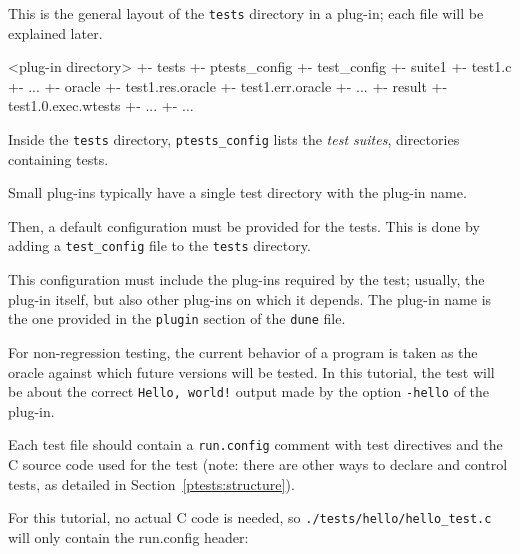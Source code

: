 This is the general layout of the \texttt{tests} directory in a \framac
plug-in; each file will be explained later.

\begin{logs}[breaklines=true]
<plug-in directory>
+- tests
   +- ptests_config
   +- test_config
   +- suite1
      +- test1.c
      +- ...
      +- oracle
         +- test1.res.oracle
         +- test1.err.oracle
         +- ...
      +- result
         +- test1.0.exec.wtests
         +- ...
  +- ...
\end{logs}

Inside the \texttt{tests} directory, \verb|ptests_config| lists the
{\em test suites}, \ie directories containing tests.


Small plug-ins typically have a single test directory with the plug-in name.

Then, a default configuration must be provided for the tests. This is done by
adding a \texttt{test\_config} file to the \texttt{tests} directory.


This configuration must include the plug-ins required by the test; usually, the
plug-in itself, but also other plug-ins on which it depends. The plug-in name
is the one provided in the \texttt{plugin} section of the \texttt{dune} file.

For non-regression testing, the current behavior of a program is taken as
the oracle against which future versions will be tested. In this tutorial, the
test will be about the correct \texttt{Hello, world!} output made by the option
\texttt{-hello} of the plug-in.

Each test file should contain a
\texttt{run.config}
comment with test directives and the C
source code used for the test (note: there are other ways to declare and
control tests, as detailed in Section~\ref{ptests:structure}).

For this tutorial, no actual C code is needed, so
\texttt{./tests/hello/hello\_test.c} will only contain the run.config header:



